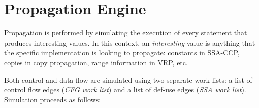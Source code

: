 \section{Propagation Engine}
\label{novillo:sec:prop-engine}

Propagation is performed by simulating the execution of every
statement that produces interesting values.  In this context, an
\textit{interesting} value is anything that the specific
implementation is looking to propagate: constants in SSA-CCP,
copies in copy propagation, range information in VRP, etc.

Both control and data flow are simulated using two separate work
lists: a list of control flow edges (\textit{CFG work list}) and a
list of def-use edges (\textit{SSA work list}).  Simulation proceeds as
follows:

